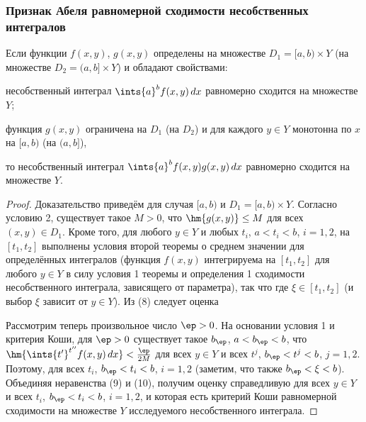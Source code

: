 \documentclass[a4paper]{article}
\begin{document}
\subsubsection{Признак Абеля равномерной сходимости несобственных
интегралов}

\begin{theorem}
Если функции $f(x,y)$, $g(x,y)$ определены на множестве
$D_1=[a,b)\times Y$ (на множестве $D_2=(a,b]\times Y$) и обладают
свойствами: \begin{nums}{-2} \item несобственный интеграл
$\ints{a}^b f(x,y)\,dx$ равномерно сходится на множестве $Y$; \item
функция $g(x,y)$ ограничена на $D_1$ (на $D_2$) и для каждого $y\in
Y$ монотонна по $x$ на $[a,b)$  (на $(a,b]$),\end{nums} то
несобственный интеграл $\ints{a}^b f(x,y)g(x,y)\,dx$ равномерно
сходится на множестве $Y$.
\end{theorem}

\begin{proof}
Доказательство приведём для случая $[a,b)$ и $D_1=[a,b)\times Y$.
Согласно условию 2, существует такое $M>0$, что $\hm{g(x,y)}\le M$
для всех $(x,y)\in D_1$. Кроме того, для любого $y\in Y$ и любых
$t_i$, $a<t_i<b$, $i=1,2$, на $[t_1,t_2]$ выполнены условия второй
теоремы о среднем значении для определённых интегралов (функция
$f(x,y)$ интегрируема на $[t_1,t_2]$ для любого $y\in Y$ в силу
условия 1 теоремы и определения 1 сходимости несобственного
интеграла, зависящего от параметра), так что
где $\xi\in[t_1,t_2]$ (и выбор $\xi$ зависит от $y\in Y$). Из (8)
следует оценка 

Рассмотрим теперь произвольное число $\ep>0$. На основании условия 1
и критерия Коши, для $\ep>0$ существует такое $b_{\ep}$,
$a<b_{\ep}<b$, что $\hm{\ints{t'}^{t''} f(x,y)\,dx} <
\frac{\ep}{2M}$ для всех $y\in Y$ и всех $t^j$, $b_{\ep}<t^j<b$,
$j=1,2$. Поэтому,  для всех $t_i$, $b_{\ep}<t_i<b$, $i=1,2$
(заметим, что также $b_{\ep}<\xi<b$). Объединяя неравенства (9) и
(10), получим оценку  справедливую для всех
$y\in Y$ и всех $t_i$, $b_{\ep} < t_i < b$, $i=1,2$, и которая есть
критерий Коши равномерной сходимости на множестве $Y$ исследуемого
несобственного интеграла.
\end{proof}
\end{document}
